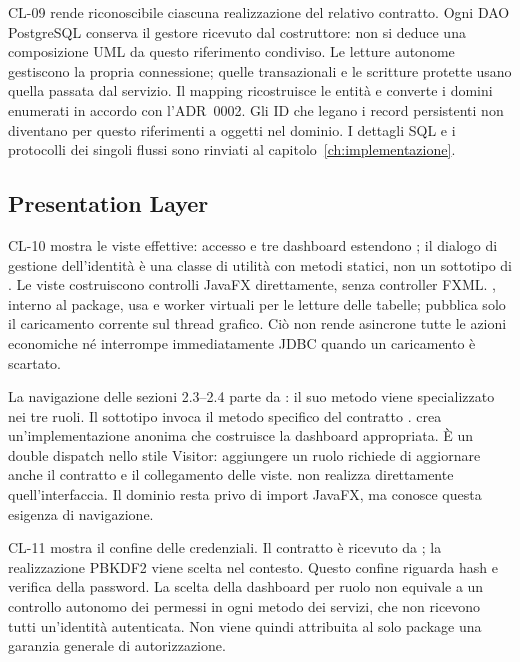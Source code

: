 CL-09 rende riconoscibile ciascuna realizzazione del relativo contratto.
Ogni DAO PostgreSQL conserva il gestore ricevuto dal costruttore: non si
deduce una composizione UML da questo riferimento condiviso. Le letture
autonome gestiscono la propria connessione; quelle transazionali e le
scritture protette usano quella passata dal servizio. Il mapping ricostruisce
le entità e converte i domini enumerati in accordo con l'ADR~0002.
Gli ID che legano i record persistenti non diventano per questo riferimenti
a oggetti nel dominio. I dettagli SQL e i protocolli dei singoli flussi
sono rinviati al capitolo~\ref{ch:implementazione}.


\clearpage

\subsection{Presentation Layer}
CL-10 mostra le viste effettive: accesso e tre dashboard estendono
; il dialogo di gestione dell'identità è una classe di
utilità con metodi statici, non un sottotipo di . Le viste
costruiscono controlli JavaFX direttamente, senza controller FXML.
, interno al package, usa  e worker virtuali
per le letture delle tabelle; pubblica solo il caricamento corrente sul
thread grafico. Ciò non rende asincrone tutte le azioni economiche né
interrompe immediatamente JDBC quando un caricamento è scartato.

La navigazione delle sezioni 2.3--2.4 parte da : il suo metodo
 viene specializzato nei tre ruoli. Il sottotipo invoca
il metodo specifico del contratto .
 crea un'implementazione anonima
che costruisce la dashboard appropriata. È un double dispatch nello
stile Visitor: aggiungere un ruolo richiede di aggiornare anche il
contratto e il collegamento delle viste.  non realizza direttamente
quell'interfaccia. Il dominio resta privo di import JavaFX, ma conosce
questa esigenza di navigazione.

CL-11 mostra il confine delle credenziali. Il contratto
 è ricevuto da ; la realizzazione
PBKDF2 viene scelta nel contesto.
Questo confine riguarda hash e verifica della password. La scelta della
dashboard per ruolo non equivale a un controllo autonomo dei permessi
in ogni metodo dei servizi, che non ricevono tutti un'identità autenticata.
Non viene quindi attribuita al solo package  una garanzia
generale di autorizzazione.
\clearpage

\clearpage
